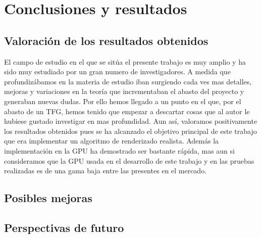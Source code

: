 \chapter{Conclusiones y resultados}


\section{Valoración de los resultados obtenidos}


El campo de estudio en el que se sitúa el presente trabajo es muy amplio y ha sido muy estudiado por un gran numero de investigadores. A medida que profundizábamos en la materia de estudio iban surgiendo cada ves mas detalles, mejoras y variaciones en la teoría que incrementaban el abasto del proyecto y generaban nuevas dudas. Por ello hemos llegado a un punto en el que, por el abasto de un TFG, hemos tenido que empezar a descartar cosas que al autor le hubiese gustado investigar en mas profundidad. Aun así, valoramos positivamente los resultados obtenidos pues se ha alcanzado el objetivo principal de este trabajo que era implementar un algoritmo de renderizado realista. Además la implementación en la GPU ha demostrado ser bastante rápida, mas aun si consideramos que la GPU usada en el desarrollo de este trabajo y en las pruebas realizadas es de una gama baja entre las presentes en el mercado.

\section{Posibles mejoras}



\section{Perspectivas de futuro}